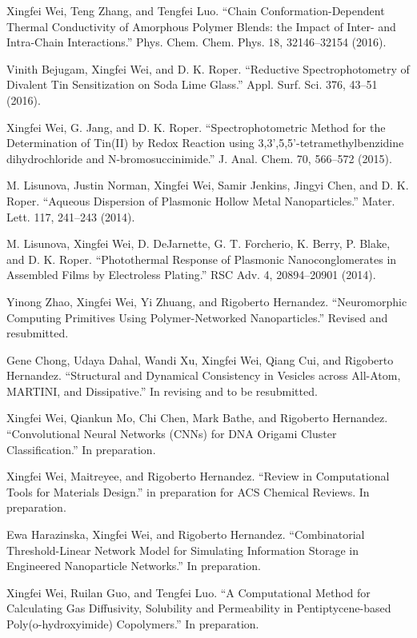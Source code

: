   \item {}
  \item {Xingfei Wei, Teng Zhang, and Tengfei Luo. 
``Chain Conformation-Dependent Thermal Conductivity of Amorphous Polymer Blends: the Impact of Inter- and Intra-Chain Interactions.''
Phys. Chem. Chem. Phys. 18, 32146--32154 (2016).}
  \item {Vinith Bejugam, Xingfei Wei, and D. K. Roper. 
``Reductive Spectrophotometry of Divalent Tin Sensitization on Soda Lime Glass.''
Appl. Surf. Sci. 376, 43--51 (2016).}
  \item {Xingfei Wei, G. Jang, and D. K. Roper. 
``Spectrophotometric Method for the Determination of Tin(II) by Redox Reaction using 3,3',5,5'-tetramethylbenzidine dihydrochloride and N-bromosuccinimide.'' 
J. Anal. Chem. 70, 566--572 (2015).}
  \item {}
  \item {M. Lisunova, Justin Norman, Xingfei Wei, Samir Jenkins, Jingyi Chen, and D. K. Roper. 
``Aqueous Dispersion of Plasmonic Hollow Metal Nanoparticles.''
Mater. Lett. 117, 241--243 (2014).}
  \item {M. Lisunova, Xingfei Wei, D. DeJarnette, G. T. Forcherio, K. Berry, P. Blake, and D. K. Roper. 
``Photothermal Response of Plasmonic Nanoconglomerates in Assembled Films by Electroless Plating.'' 
RSC Adv. 4, 20894--20901 (2014).}



  \item {Yinong Zhao, Xingfei Wei, Yi Zhuang, and Rigoberto Hernandez. ``Neuromorphic Computing Primitives Using Polymer-Networked Nanoparticles.'' Revised and resubmitted.}
 \item {Gene Chong, Udaya Dahal, Wandi Xu, Xingfei Wei, Qiang Cui, and Rigoberto Hernandez. ``Structural and Dynamical Consistency in Vesicles across All-Atom, MARTINI, and Dissipative.'' In revising and to be resubmitted.}
  \item {Xingfei Wei, Qiankun Mo, Chi Chen, Mark Bathe, and Rigoberto Hernandez. ``Convolutional Neural Networks (CNNs) for DNA Origami Cluster Classification.'' In preparation.}
  \item {Xingfei Wei, Maitreyee, and Rigoberto Hernandez. ``Review in Computational Tools for Materials Design.'' in preparation for ACS Chemical Reviews. In preparation.}
  \item {Ewa Harazinska, Xingfei Wei, and Rigoberto Hernandez. ``Combinatorial Threshold-Linear Network Model for Simulating Information Storage in Engineered Nanoparticle Networks.'' In preparation.}
 \item {Xingfei Wei, Ruilan Guo, and Tengfei Luo. ``A Computational Method for Calculating Gas Diffusivity, Solubility and Permeability in Pentiptycene-based Poly(o-hydroxyimide) Copolymers.'' In preparation.}